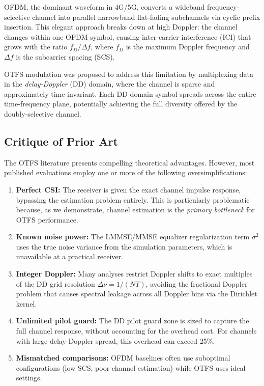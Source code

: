 \documentclass[11pt,a4paper,twoside]{article}
\begin{document}
OFDM, the dominant waveform in 4G/5G, converts a wideband frequency-selective channel into parallel narrowband flat-fading subchannels via cyclic prefix insertion. This elegant approach breaks down at high Doppler: the channel changes within one OFDM symbol, causing inter-carrier interference (ICI) that grows with the ratio $f_D / \Delta f$, where $f_D$ is the maximum Doppler frequency and $\Delta f$ is the subcarrier spacing (SCS).

OTFS modulation \cite{hadani2017} was proposed to address this limitation by multiplexing data in the \emph{delay-Doppler} (DD) domain, where the channel is sparse and approximately time-invariant. Each DD-domain symbol spreads across the entire time-frequency plane, potentially achieving the full diversity offered by the doubly-selective channel.

\subsection{Critique of Prior Art}

The OTFS literature presents compelling theoretical advantages. However, most published evaluations employ one or more of the following oversimplifications:

\begin{enumerate}[label=(\roman*)]
    \item \textbf{Perfect CSI:} The receiver is given the exact channel impulse response, bypassing the estimation problem entirely. This is particularly problematic because, as we demonstrate, channel estimation is the \emph{primary bottleneck} for OTFS performance.
    
    \item \textbf{Known noise power:} The LMMSE/MMSE equalizer regularization term $\sigma^2$ uses the true noise variance from the simulation parameters, which is unavailable at a practical receiver.
    
    \item \textbf{Integer Doppler:} Many analyses restrict Doppler shifts to exact multiples of the DD grid resolution $\Delta\nu = 1/(NT)$, avoiding the fractional Doppler problem that causes spectral leakage across all Doppler bins via the Dirichlet kernel.
    
    \item \textbf{Unlimited pilot guard:} The DD pilot guard zone is sized to capture the full channel response, without accounting for the overhead cost. For channels with large delay-Doppler spread, this overhead can exceed 25\%.
    
    \item \textbf{Mismatched comparisons:} OFDM baselines often use suboptimal configurations (low SCS, poor channel estimation) while OTFS uses ideal settings.
\end{enumerate}
\end{document}
